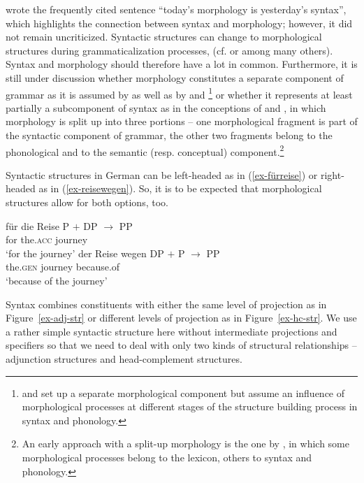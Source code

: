 \documentclass[output=paper
  ,nobabel
  ,draftmode
  ,colorlinks, citecolor=brown
]{langscibook}
\begin{document}
\citet[413]{Givon1971} wrote the frequently cited sentence ``today's morphology is yesterday's syntax'',  which highlights the connection between syntax and morphology; however, it did not remain uncriticized. Syntactic structures can change to morphological structures during grammaticalization processes, (cf. \cite{HopperTraugott1993} or \cite{Lehmann2015} among many others). Syntax and morphology should therefore have a lot in common. Furthermore, it is still under discussion whether morphology constitutes a separate component of grammar as it is assumed by \citet{Sadock1991, Sadock2012} as well as by \citet{Borer1988} and \citet{Spencer1991}\footnote{\citet{Borer1988} and \citet{Spencer1991} set up a separate morphological component but assume an influence of morphological processes at different stages of the structure building process in syntax and phonology.} or whether it represents at least partially a subcomponent of syntax as in the conceptions of \citet{Jackendoff1997} and \citet{AckemaNeeleman2004}, in which morphology is split up into three portions – one morphological fragment is part of the syntactic component of grammar, the other two fragments belong to the phonological and to the semantic (resp. conceptual) component.\footnote{An early approach with a split-up morphology is the one by \citet{ShibataniKageyama1988}, in which some morphological processes belong to the lexicon, others to syntax and phonology.}

Syntactic structures in German can be left-headed as in (\ref{ex-fürreise}) or right-headed as in (\ref{ex-reisewegen}). So, it is to be expected that morphological structures allow for both options, too.

\eal 
\ex\label{ex-fürreise}
\gll für die Reise  \hspace{45pt} P $+$ DP $\rightarrow$ PP\\ for the.\textsc{acc} journey  \\
\glt `for the journey'
\ex\label{ex-reisewegen}
\gll der Reise  wegen\hspace{30pt} DP $+$ P $\rightarrow$ PP\\ the.\textsc{gen}   journey   because.of  \\
\glt `because of the journey'
\zl

\noindent 
Syntax combines constituents with either the same level of projection as in Figure~\ref{ex-adj-str} or different levels of projection as in Figure~\ref{ex-hc-str}. We use a rather simple syntactic structure here without intermediate projections and specifiers so that we need to deal with only two kinds of structural relationships – adjunction structures and head-complement structures.
\end{document}
